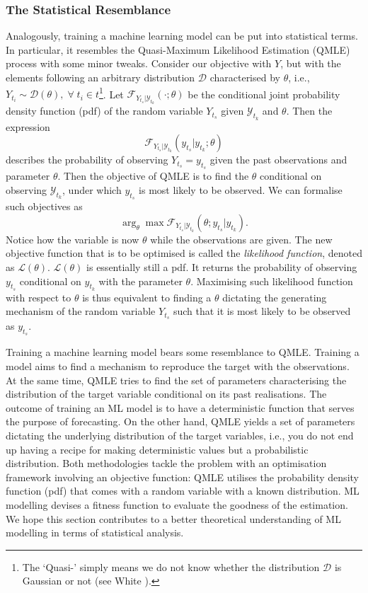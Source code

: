 \subsubsection{The Statistical Resemblance}
Analogously, training a machine learning model can be put into statistical terms. In particular, it resembles the Quasi-Maximum Likelihood Estimation (QMLE) process with some minor tweaks. Consider our objective with $Y$, but with the elements following an arbitrary distribution $\mathcal{D}$ characterised by $\theta$, i.e., $Y_{t_i} \sim \mathcal{D}(\theta), \; \forall \; t_i \in t$\footnote{The `Quasi-' simply means we do not know whether the distribution $\mathcal{D}$ is Gaussian or not (see White \citeyear{white1982maximum}).}. Let $\mathcal{F}_{Y_{t_s} | \mathcal{Y}_{t_k}}(\cdot; \theta)$ be the conditional joint probability density function (pdf) of the random variable $Y_{t_s}$ given $\mathcal{Y}_{t_k}$ and $\theta$. Then the expression
\begin{equation*}
    \mathcal{F}_{Y_{t_s} | \mathcal{Y}_{t_k}}(y_{t_s}| y_{t_k} ; \theta)
\end{equation*}
describes the probability of observing $Y_{t_s} = y_{t_s}$ given the past observations and parameter $\theta$. Then the objective of QMLE is to find the $\theta$ conditional on observing $\mathcal{Y}_{t_k}$, under which $y_{t_s}$ is most likely to be observed. We can formalise such objectives as
\begin{equation*}
    \arg_{\theta} \max \mathcal{F}_{Y_{t_s} | \mathcal{Y}_{t_k}}(\theta ; y_{t_s} | y_{t_k}).
\end{equation*}
Notice how the variable is now $\theta$ while the observations are given. The new objective function that is to be optimised is called the \textit{likelihood function}, denoted as $\mathcal{L}(\theta)$. $\mathcal{L}(\theta)$ is essentially still a pdf. It returns the probability of observing $y_{t_s}$ conditional on $y_{t_k}$ with the parameter $\theta$. Maximising such likelihood function with respect to $\theta$ is thus equivalent to finding a $\theta$ dictating the generating mechanism of the random variable $Y_{t_s}$ such that it is most likely to be observed as $y_{t_s}$.

Training a machine learning model bears some resemblance to QMLE. Training a model aims to find a mechanism to reproduce the target with the observations. At the same time, QMLE tries to find the set of parameters characterising the distribution of the target variable conditional on its past realisations. The outcome of training an ML model is to have a deterministic function that serves the purpose of forecasting. On the other hand, QMLE yields a set of parameters dictating the underlying distribution of the target variables, i.e., you do not end up having a recipe for making deterministic values but a probabilistic distribution. Both methodologies tackle the problem with an optimisation framework involving an objective function: QMLE utilises the probability density function (pdf) that comes with a random variable with a known distribution. ML modelling devises a fitness function to evaluate the goodness of the estimation. We hope this section contributes to a better theoretical understanding of ML modelling in terms of statistical analysis.

